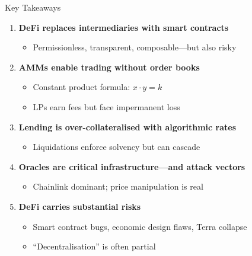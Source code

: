 \documentclass[10pt]{beamer}
\begin{document}
\begin{frame}{Key Takeaways}
  \begin{enumerate}
    \item \textbf{DeFi replaces intermediaries with smart contracts}
    \begin{itemize}
      \item Permissionless, transparent, composable---but also risky
    \end{itemize}
    
    \vspace{0.3em}
    \item \textbf{AMMs enable trading without order books}
    \begin{itemize}
      \item Constant product formula: $x \cdot y = k$
      \item LPs earn fees but face impermanent loss
    \end{itemize}
    
    \vspace{0.3em}
    \item \textbf{Lending is over-collateralised with algorithmic rates}
    \begin{itemize}
      \item Liquidations enforce solvency but can cascade
    \end{itemize}
    
    \vspace{0.3em}
    \item \textbf{Oracles are critical infrastructure---and attack vectors}
    \begin{itemize}
      \item Chainlink dominant; price manipulation is real
    \end{itemize}
    
    \vspace{0.3em}
    \item \textbf{DeFi carries substantial risks}
    \begin{itemize}
      \item Smart contract bugs, economic design flaws, Terra collapse
      \item ``Decentralisation'' is often partial
    \end{itemize}
  \end{enumerate}
\end{frame}
\end{document}
